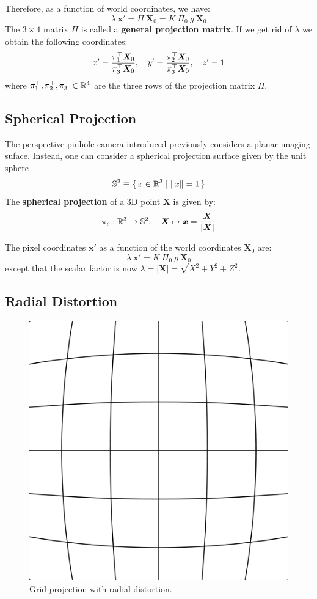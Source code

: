 Therefore, as a function of world coordinates, we have:
\[\boxed{ \lambda\ \bm{x'} = \Pi\ \bm{X}_0
	= K\ \Pi_0\ g\ \bm{X}_0}
\]
The $3 \times 4$ matrix $\Pi$ is called a \textbf{general projection matrix}.
If we get rid of $\lambda$ we obtain the following coordinates:
\[ x' = \frac{\pi_1^{\top} \bm{X}_0}{\pi_3^{\top} \bm{X}_0},\quad
 y' = \frac{\pi_2^{\top} \bm{X}_0}{\pi_3^{\top} \bm{X}_0},\quad
 z' = 1
\]
where $\pi_1^{\top}, \pi_2^{\top}, \pi_3^{\top} \in \mathbb{R}^4$
are the three rows of the projection matrix $\Pi$.


\subsection{Spherical Projection}%
\label{sub:spherical_projection}


The perspective pinhole camera introduced previously considers a planar
imaging suface. Instead, one can consider a spherical projection surface
given by the unit sphere
\[\mathbb{S}^2 \equiv \{\, x \in \mathbb{R}^3 \mid{} \|x\| = 1 \,\}\]
The \textbf{spherical projection} of a 3D point $\bm{X}$ is given by:
\[\pi_s : \mathbb{R}^3 \rightarrow \mathbb{S}^2;\quad
	\bm{X} \mapsto \bm{x} = \frac{\bm{X}}{\bm{|X|}}\]

The pixel coordinates $\bm{x}'$ as a function of the world coordinates
$\bm{X}_0$ are:
\[
	\lambda\ \bm{x}' = K\ \Pi_0\ g\ \bm{X}_0
\]
except that the scalar factor is now $\lambda = |\bm{X}|
= \sqrt{ X^2 + Y^2 + Z^2 }$.


\subsection{Radial Distortion}%
\label{sub:radial_distortion}


\begin{figure}[h]
\centering
\includegraphics[width=\columnwidth]{img/barrel_distortion.png}
\caption{Grid projection with radial distortion.}%
\label{fig:radial_distortion}
\end{figure}

